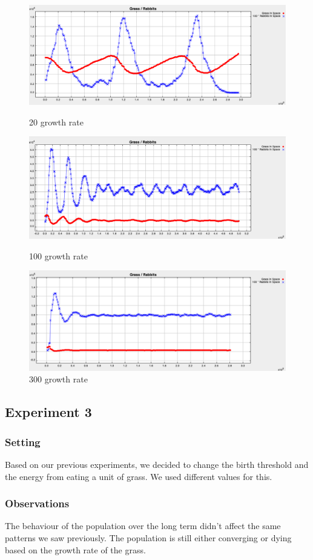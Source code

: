 \documentclass[11pt]{article}
\begin{document}
\begin{figure}[!htb]
  \includegraphics[width=\linewidth]{ex2-chart-20.png}
  \caption{20 growth rate}\label{fig:ex2-1}
\endminipage\hfill
{}
  \includegraphics[width=\linewidth]{ex2-chart-100.png}
  \caption{100 growth rate}\label{fig:ex2-2}
\endminipage\hfill
{}%
  \includegraphics[width=\linewidth]{ex2-chart-300.png}
  \caption{300 growth rate}\label{fig:ex2-3}
\endminipage
\end{figure}


\subsection{Experiment 3}

\subsubsection{Setting}

Based on our previous experiments, we decided to change the birth threshold and the energy from eating a unit of grass. We used different values for this.

\subsubsection{Observations}

The behaviour of the population over the long term didn't affect the same patterns we saw previously. The population is still either converging or dying based on the growth rate of the grass.
\end{document}
